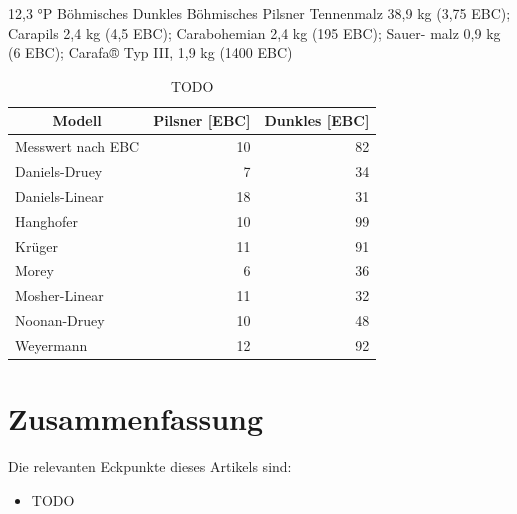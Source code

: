 \documentclass[a4paper,parskip=half]{scrartcl}
\begin{document}
12,3 °P Böhmisches Dunkles
Böhmisches Pilsner Tennenmalz 38,9
kg (3,75 EBC); Carapils 2,4 kg (4,5 EBC);
Carabohemian 2,4 kg (195 EBC); Sauer-
malz 0,9 kg (6 EBC); Carafa® Typ III, 1,9
kg (1400 EBC)

\begin{table}[H]
\centering
\begin{tabular}{lrr}
\toprule
\multicolumn{1}{c}{\textbf{Modell}} & \multicolumn{1}{c}{\textbf{Pilsner [EBC]}} & \multicolumn{1}{c}{\textbf{Dunkles [EBC]}} \\
\midrule
Messwert nach EBC & 10 & 82 \\
Daniels-Druey & 7 & 34 \\
Daniels-Linear & 18 & 31 \\
Hanghofer & 10 & 99 \\
Krüger & 11 & 91 \\
Morey & 6 & 36 \\
Mosher-Linear & 11 & 32 \\
Noonan-Druey & 10 & 48 \\
Weyermann & 12 & 92 \\
\bottomrule
\end{tabular}
\caption{TODO \textcite{KrausWeyermann2021c}}
\label{table:modelcomparepilsner}
\end{table}

\section*{Zusammenfassung}


\parencite{Bruecklmeier2018}
\parencite{Holle2010}

\parencite{Smith2008}
\parencite{Bies2010}
\parencite{Tucker2017}

\parencite{KrausWeyermann2021a}
\parencite{KrausWeyermann2021b}
\parencite{KrausWeyermann2021c}

\parencite{Lange2016}
\parencite{Caro2019}
\parencite{Daniels2012}

Die relevanten Eckpunkte dieses Artikels sind:

\begin{itemize}
\item TODO
\end{itemize}

\printbibliography[title=Quellen]
\end{document}
